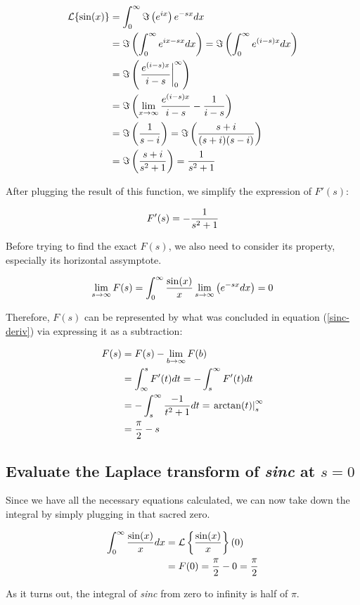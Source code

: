 $$
\begin{aligned}
	\mathcal{L}\{\sin(x)\}&=\int_0^\infty\Im\left(e^{ix}\right)e^{-sx}dx \\
	&=\Im\left(\int_0^\infty e^{ix-sx}dx\right)
	=\Im\left(\int_0^\infty e^{(i-s)x}dx\right) \\
	&=\Im\left(\left.e^{(i-s)x}\over i-s\right|_0^\infty\right) \\
	&=\Im\left(\lim_{x\to\infty}{e^{(i-s)x}\over i-s}-{1\over i-s}\right) \\
	&=\Im\left(1\over s-i\right)=\Im\left(s+i\over(s+i)(s-i)\right) \\
	&=\Im\left(s+i\over s^2+1\right)={1\over s^2+1}
\end{aligned}
$$

After plugging the result of this function, we simplify the expression of
$F'(s)$:

\begin{equation}
	F'(s)=-{1\over s^2+1}
	\label{sinc-deriv}
\end{equation}

Before trying to find the exact $F(s)$, we also need to consider its property,
especially its horizontal assymptote.

$$
\lim_{s\to\infty}F(s)=\int_0^\infty{\sin(x)\over x}
\lim_{s\to\infty}\left(e^{-sx}dx\right)=0
$$

Therefore, $F(s)$ can be represented by what was concluded in equation
(\ref{sinc-deriv}) via expressing it as a subtraction:

$$
\begin{aligned}
	F(s)&=F(s)-\lim_{b\to\infty}F(b) \\
	&=\int_\infty^sF'(t)dt=-\int_s^\infty F'(t)dt \\
	&=-\int_s^\infty{-1\over t^2+1}dt=\left.\arctan(t)\right|_s^\infty \\
	&={\pi\over 2}-s
\end{aligned}
$$

\subsection{Evaluate the Laplace transform of \textit{sinc} at $s=0$}

Since we have all the necessary equations calculated, we can now take down the
integral by simply plugging in that sacred zero.

$$
\begin{aligned}
	\int_0^\infty{\sin(x)\over x}dx&=\mathcal{L}\left\{\sin(x)\over x\right\}(0) \\
	&=F(0)={\pi\over2}-0={\pi\over2}
\end{aligned}
$$

As it turns out, the integral of \textit{sinc} from zero to infinity is half of
$\pi$.
